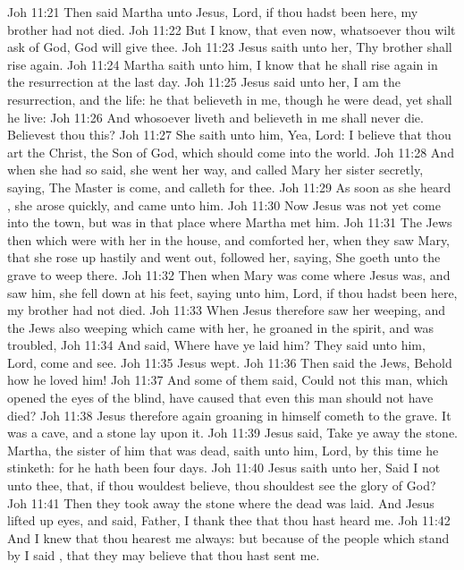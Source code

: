 \vs Joh 11:21 Then said Martha unto Jesus, Lord, if thou hadst been here, my brother had not died.
\vs Joh 11:22 But I know, that even now, whatsoever thou wilt ask of God, God will give  thee.
\vs Joh 11:23 Jesus saith unto her, Thy brother shall rise again.
\vs Joh 11:24 Martha saith unto him, I know that he shall rise again in the resurrection at the last day.
\vs Joh 11:25 Jesus said unto her, I am the resurrection, and the life: he that believeth in me, though he were dead, yet shall he live:
\vs Joh 11:26 And whosoever liveth and believeth in me shall never die. Believest thou this?
\vs Joh 11:27 She saith unto him, Yea, Lord: I believe that thou art the Christ, the Son of God, which should come into the world.
\vs Joh 11:28 And when she had so said, she went her way, and called Mary her sister secretly, saying, The Master is come, and calleth for thee.
\vs Joh 11:29 As soon as she heard , she arose quickly, and came unto him.
\vs Joh 11:30 Now Jesus was not yet come into the town, but was in that place where Martha met him.
\vs Joh 11:31 The Jews then which were with her in the house, and comforted her, when they saw Mary, that she rose up hastily and went out, followed her, saying, She goeth unto the grave to weep there.
\vs Joh 11:32 Then when Mary was come where Jesus was, and saw him, she fell down at his feet, saying unto him, Lord, if thou hadst been here, my brother had not died.
\vs Joh 11:33 When Jesus therefore saw her weeping, and the Jews also weeping which came with her, he groaned in the spirit, and was troubled,
\vs Joh 11:34 And said, Where have ye laid him? They said unto him, Lord, come and see.
\vs Joh 11:35 Jesus wept.
\vs Joh 11:36 Then said the Jews, Behold how he loved him!
\vs Joh 11:37 And some of them said, Could not this man, which opened the eyes of the blind, have caused that even this man should not have died?
\vs Joh 11:38 Jesus therefore again groaning in himself cometh to the grave. It was a cave, and a stone lay upon it.
\vs Joh 11:39 Jesus said, Take ye away the stone. Martha, the sister of him that was dead, saith unto him, Lord, by this time he stinketh: for he hath been  four days.
\vs Joh 11:40 Jesus saith unto her, Said I not unto thee, that, if thou wouldest believe, thou shouldest see the glory of God?
\vs Joh 11:41 Then they took away the stone  where the dead was laid. And Jesus lifted up  eyes, and said, Father, I thank thee that thou hast heard me.
\vs Joh 11:42 And I knew that thou hearest me always: but because of the people which stand by I said , that they may believe that thou hast sent me.

